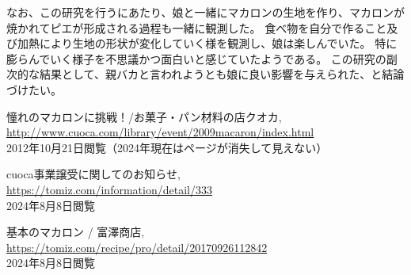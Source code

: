 \documentclass[uplatex,dvipdfmx,a4j,12pt]{jsarticle}
\begin{document}
なお、この研究を行うにあたり、娘と一緒にマカロンの生地を作り、マカロンが焼かれてピエが形成される過程も一緒に観測した。 
食べ物を自分で作ること及び加熱により生地の形状が変化していく様を観測し、娘は楽しんでいた。 
特に膨らんでいく様子を不思議かつ面白いと感じていたようである。 
この研究の副次的な結果として、親バカと言われようとも娘に良い影響を与えられた、と結論づけたい。


\begin{thebibliography}{9}

    憧れのマカロンに挑戦！/お菓子・パン材料の店クオカ, \\
    \url{http://www.cuoca.com/library/event/2009macaron/index.html} \\
    2012年10月21日閲覧（2024年現在はページが消失して見えない）

    cuoca事業譲受に関してのお知らせ, \\
    \url{https://tomiz.com/information/detail/333} \\
    2024年8月8日閲覧
    
    基本のマカロン / 富澤商店, \\
    \url{https://tomiz.com/recipe/pro/detail/20170926112842} \\
    2024年8月8日閲覧




\end{thebibliography}
\end{document}
